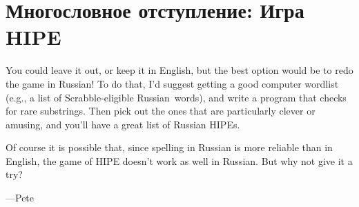 \chapter{Многословное отступление: Игра HIPE}

You could leave it out, or keep it in English,
but the best option would be to redo the game
in Russian! To do that, I'd suggest getting a good
computer wordlist (e.g., a list of Scrabble-eligible
Russian words), and write a program that checks
for rare substrings.
Then pick out the ones that are particularly clever or amusing, and you'll have
a great list of Russian HIPEs. 

Of course it is possible that, since spelling in
Russian is more reliable than in English, the game of
HIPE doesn't work as well in Russian.
But why not
give it a try?

---Pete
